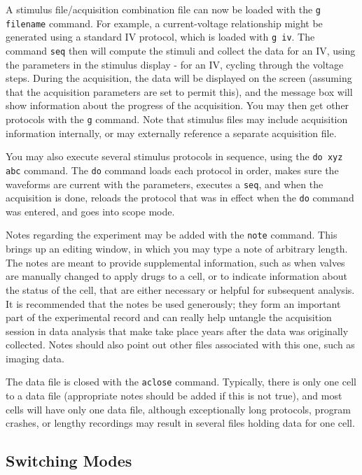 \documentclass[11pt, letterpaper, titlepage]{paper}
\begin{document}
A stimulus file/acquisition combination file can now be loaded 
with the \texttt{g filename} command. For example, a 
current-voltage relationship might be generated using a standard 
IV protocol, which is loaded with \texttt{g iv}. The command 
\texttt{seq} then will compute the stimuli and collect the data 
for an IV, using the parameters in the stimulus display - for an 
IV, cycling through the voltage steps. During the acquisition, the 
data will be displayed on the screen (assuming that the 
acquisition parameters are set to permit this), and the message 
box will show information about the progress of the acquisition. 
You may then get other protocols with the \texttt{g} command. Note 
that stimulus files may include acquisition information 
internally, or may externally reference a separate acquisition 
file.

You may also execute several stimulus protocols in sequence, using 
the \texttt{do xyz abc} command. The \texttt{do} command loads 
each protocol in order, makes sure the waveforms are current with 
the parameters, executes a \texttt{seq}, and when the acquisition 
is done, reloads the protocol that was in effect when the 
\texttt{do} command was entered, and goes into scope mode.


Notes regarding the experiment may be added with the \texttt{note} command. This brings 
up an editing window, in which you may type a note of arbitrary length. The notes are 
meant to provide supplemental information, such as when valves are manually changed to 
apply drugs to a cell, or to indicate information about the status of the cell, that are 
either necessary or helpful for subsequent analysis. It is recommended that the notes be 
used generously; they form an important part of the experimental record and can really 
help untangle the acquisition session in data analysis that make take place years after 
the data was originally collected. Notes should also point out other files associated 
with this one, such as imaging data.

The data file is closed with the \texttt{aclose} command. 
Typically, there is only one cell to a data file (appropriate 
notes should be added if this is not true), and most cells will 
have only one data file, although exceptionally long protocols, 
program crashes, or lengthy recordings may result in several files 
holding data for one cell.


\subsection{Switching Modes}
\end{document}
